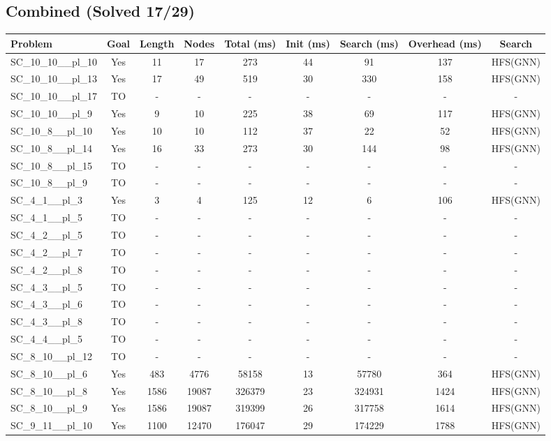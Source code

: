 \documentclass{article}
\begin{document}
\subsection*{Combined (Solved 17/29)}
\begin{tabular}{lcccccccc}
\toprule
Problem & Goal & Length & Nodes & Total (ms) & Init (ms) & Search (ms) & Overhead (ms) & Search \\
\midrule
SC\_10\_10\_\_pl\_10 & Yes & 11 & 17 & 273 & 44 & 91 & 137 & HFS(GNN) \\
SC\_10\_10\_\_pl\_13 & Yes & 17 & 49 & 519 & 30 & 330 & 158 & HFS(GNN) \\
SC\_10\_10\_\_pl\_17 & TO & - & - & - & - & - & - & - \\
SC\_10\_10\_\_pl\_9 & Yes & 9 & 10 & 225 & 38 & 69 & 117 & HFS(GNN) \\
SC\_10\_8\_\_pl\_10 & Yes & 10 & 10 & 112 & 37 & 22 & 52 & HFS(GNN) \\
SC\_10\_8\_\_pl\_14 & Yes & 16 & 33 & 273 & 30 & 144 & 98 & HFS(GNN) \\
SC\_10\_8\_\_pl\_15 & TO & - & - & - & - & - & - & - \\
SC\_10\_8\_\_pl\_9 & TO & - & - & - & - & - & - & - \\
SC\_4\_1\_\_pl\_3 & Yes & 3 & 4 & 125 & 12 & 6 & 106 & HFS(GNN) \\
SC\_4\_1\_\_pl\_5 & TO & - & - & - & - & - & - & - \\
SC\_4\_2\_\_pl\_5 & TO & - & - & - & - & - & - & - \\
SC\_4\_2\_\_pl\_7 & TO & - & - & - & - & - & - & - \\
SC\_4\_2\_\_pl\_8 & TO & - & - & - & - & - & - & - \\
SC\_4\_3\_\_pl\_5 & TO & - & - & - & - & - & - & - \\
SC\_4\_3\_\_pl\_6 & TO & - & - & - & - & - & - & - \\
SC\_4\_3\_\_pl\_8 & TO & - & - & - & - & - & - & - \\
SC\_4\_4\_\_pl\_5 & TO & - & - & - & - & - & - & - \\
SC\_8\_10\_\_pl\_12 & TO & - & - & - & - & - & - & - \\
SC\_8\_10\_\_pl\_6 & Yes & 483 & 4776 & 58158 & 13 & 57780 & 364 & HFS(GNN) \\
SC\_8\_10\_\_pl\_8 & Yes & 1586 & 19087 & 326379 & 23 & 324931 & 1424 & HFS(GNN) \\
SC\_8\_10\_\_pl\_9 & Yes & 1586 & 19087 & 319399 & 26 & 317758 & 1614 & HFS(GNN) \\
SC\_9\_11\_\_pl\_10 & Yes & 1100 & 12470 & 176047 & 29 & 174229 & 1788 & HFS(GNN) \\

\end{tabular}
\end{document}
